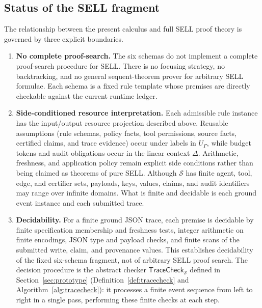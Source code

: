 \documentclass[a4paper,fleqn]{cas-sc}
\newcommand{\TraceCheck}{\mathsf{TraceCheck}}
\begin{document}
\subsection{Status of the SELL fragment}\label{subsec:sell-status}

The relationship between the present calculus and full SELL proof theory is
governed by three explicit boundaries.

\begin{enumerate}
\item \textbf{No complete proof-search.}
  The six schemas do not implement a complete proof-search procedure for SELL.
  There is no focusing strategy, no backtracking, and no general sequent-theorem prover for arbitrary SELL formulae.
  Each schema is a fixed rule template whose premises are directly checkable against the current runtime ledger.

\item \textbf{Side-conditioned resource interpretation.}
  Each admissible rule instance has the input/output resource projection
  described above. Reusable assumptions (rule schemas, policy facts, tool
  permissions, source facts, certified claims, and trace evidence) occur under
  labels in \(U_{\Gamma}\), while budget tokens and audit obligations occur in
  the linear context \(\Delta\). Arithmetic, freshness, and application policy
  remain explicit side conditions rather than being claimed as theorems of pure
  SELL.
  Although \(\mathcal{S}\) has finite agent, tool, edge, and certifier sets,
  payloads, keys, values, claims, and audit identifiers may range over infinite
  domains. What is finite and decidable is each ground event instance and each
  submitted trace.

\item \textbf{Decidability.}
  For a finite ground JSON trace, each premise is decidable by finite
  specification membership and freshness tests, integer arithmetic on finite encodings,
  JSON type and payload checks, and finite scans of the submitted write,
  claim, and provenance values. This establishes decidability of the fixed
  six-schema fragment, not of arbitrary SELL proof search.
  The decision procedure is the abstract checker \(\TraceCheck_{\mathcal{S}}\) defined in
  Section~\ref{sec:prototype} (Definition~\ref{def:tracecheck} and Algorithm~\ref{alg:tracecheck}):
  it processes a finite event sequence from left to right in a single pass,
  performing these finite checks at each step.
\end{enumerate}
\end{document}
